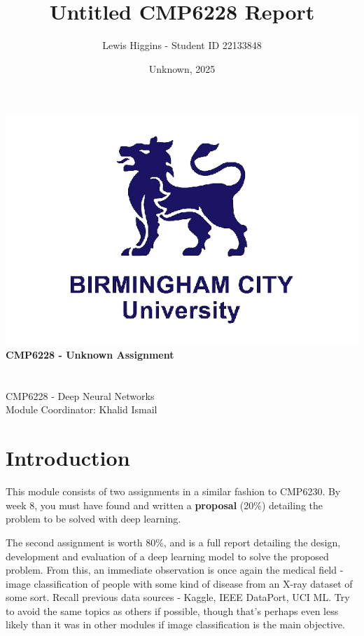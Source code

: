 \documentclass[12pt]{report}
\title{Untitled CMP6228 Report}
\author{Lewis Higgins - Student ID 22133848}
\date{Unknown, 2025}
\newcommand{\para}{\vspace{7pt}\noindent}
\begin{document}
\makeatletter
\begin{titlepage}
    \begin{center}
        \includegraphics[width=0.7\linewidth]{BCU}\\[4ex]
        {\huge \bfseries CMP6228 - Unknown Assignment}\\[2ex]
        {\large \bfseries  \@title}\\[50ex]
        {\@author}\\[2ex]
        {CMP6228 - Deep Neural Networks}\\[2ex]
        {Module Coordinator: Khalid Ismail}\\[10ex]
    \end{center}
\end{titlepage}
\makeatother
\thispagestyle{empty}
\newpage


\setcounter{page}{0}

\tableofcontents
\thispagestyle{empty}

\chapter*{Introduction}
This module consists of two assignments in a similar fashion to CMP6230. 
By week 8, you must have found and written a \textbf{proposal} (20\%) detailing 
the problem to be solved with deep learning.

\para The second assignment is worth 80\%, and is a full report detailing the design, development
and evaluation of a deep learning model to solve the proposed problem. From this, an immediate 
observation is once again the medical field - image classification of people with some kind of disease 
from an X-ray dataset of some sort. Recall previous data sources - Kaggle, IEEE DataPort, UCI ML. Try 
to avoid the same topics as others if possible, though that's perhaps even less likely than it was in other 
modules if image classification is the main objective.
\end{document}
